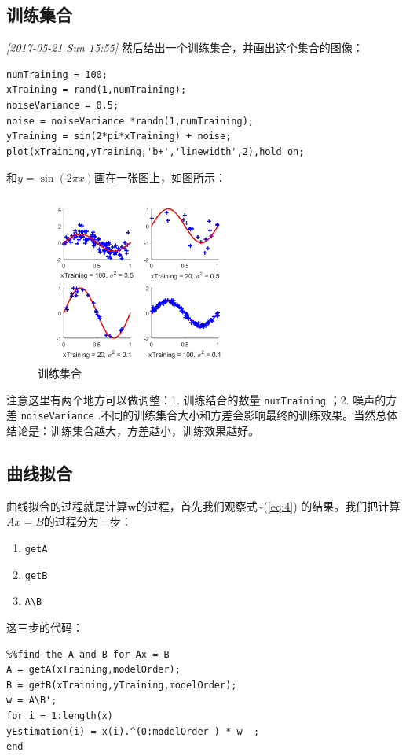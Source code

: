 \documentclass[10pt,a4paper,UTF8]{article}
\begin{document}
\subsection{训练集合}
\label{sec:org6c992ad}
   \textit{[2017-05-21 Sun 15:55]}
然后给出一个训练集合，并画出这个集合的图像：
\lstset{language=matlab,label= ,caption= ,captionpos=b,firstnumber=1,numbers=left}
\begin{lstlisting}
numTraining = 100;
xTraining = rand(1,numTraining);
noiseVariance = 0.5;
noise = noiseVariance *randn(1,numTraining);
yTraining = sin(2*pi*xTraining) + noise;
plot(xTraining,yTraining,'b+','linewidth',2),hold on;
\end{lstlisting}
和\(y = \sin(2\pi x)\)画在一张图上，如图所示：
\begin{figure}[htbp]
\centering
\includegraphics[width=0.6\textwidth]{../../img/computer_prml/20170521figure2.png}
\caption{\label{fig:org7b5b9d5}
训练集合}
\end{figure}

注意这里有两个地方可以做调整：1. 训练结合的数量 \texttt{numTraining} ；2. 噪声的方差 \texttt{noiseVariance} .不同的训练集合大小和方差会影响最终的训练效果。当然总体结论是：训练集合越大，方差越小，训练效果越好。
\subsection{曲线拟合}
\label{sec:org9e26143}


曲线拟合的过程就是计算\(\mathbf{w}\)的过程，首先我们观察式\textasciitilde{}(\ref{eq:4}) 的结果。我们把计算\(Ax=B\)的过程分为三步：
\begin{enumerate}
\item \texttt{getA}
\item \texttt{getB}
\item \texttt{A\textbackslash{}B}
\end{enumerate}
这三步的代码：
\lstset{language=matlab,label= ,caption= ,captionpos=b,firstnumber=1,numbers=left}
\begin{lstlisting}
%%find the A and B for Ax = B
A = getA(xTraining,modelOrder);
B = getB(xTraining,yTraining,modelOrder);
w = A\B';
for i = 1:length(x)
yEstimation(i) = x(i).^(0:modelOrder ) * w  ;
end
\end{lstlisting}
\end{document}
